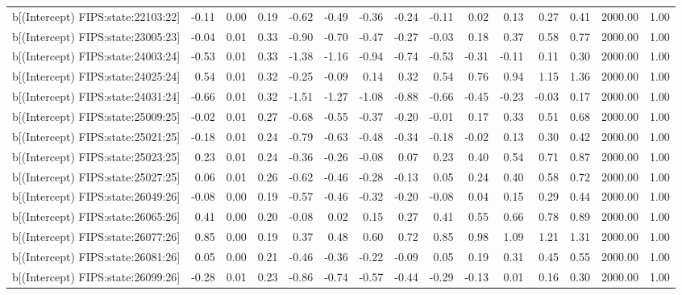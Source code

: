 \begin{table}[ht]
\begin{tabular}{rrrrrrrrrrrrrrr}
  b[(Intercept) FIPS:state:22103:22] & -0.11 & 0.00 & 0.19 & -0.62 & -0.49 & -0.36 & -0.24 & -0.11 & 0.02 & 0.13 & 0.27 & 0.41 & 2000.00 & 1.00 \\ 
  b[(Intercept) FIPS:state:23005:23] & -0.04 & 0.01 & 0.33 & -0.90 & -0.70 & -0.47 & -0.27 & -0.03 & 0.18 & 0.37 & 0.58 & 0.77 & 2000.00 & 1.00 \\ 
  b[(Intercept) FIPS:state:24003:24] & -0.53 & 0.01 & 0.33 & -1.38 & -1.16 & -0.94 & -0.74 & -0.53 & -0.31 & -0.11 & 0.11 & 0.30 & 2000.00 & 1.00 \\ 
  b[(Intercept) FIPS:state:24025:24] & 0.54 & 0.01 & 0.32 & -0.25 & -0.09 & 0.14 & 0.32 & 0.54 & 0.76 & 0.94 & 1.15 & 1.36 & 2000.00 & 1.00 \\ 
  b[(Intercept) FIPS:state:24031:24] & -0.66 & 0.01 & 0.32 & -1.51 & -1.27 & -1.08 & -0.88 & -0.66 & -0.45 & -0.23 & -0.03 & 0.17 & 2000.00 & 1.00 \\ 
  b[(Intercept) FIPS:state:25009:25] & -0.02 & 0.01 & 0.27 & -0.68 & -0.55 & -0.37 & -0.20 & -0.01 & 0.17 & 0.33 & 0.51 & 0.68 & 2000.00 & 1.00 \\ 
  b[(Intercept) FIPS:state:25021:25] & -0.18 & 0.01 & 0.24 & -0.79 & -0.63 & -0.48 & -0.34 & -0.18 & -0.02 & 0.13 & 0.30 & 0.42 & 2000.00 & 1.00 \\ 
  b[(Intercept) FIPS:state:25023:25] & 0.23 & 0.01 & 0.24 & -0.36 & -0.26 & -0.08 & 0.07 & 0.23 & 0.40 & 0.54 & 0.71 & 0.87 & 2000.00 & 1.00 \\ 
  b[(Intercept) FIPS:state:25027:25] & 0.06 & 0.01 & 0.26 & -0.62 & -0.46 & -0.28 & -0.13 & 0.05 & 0.24 & 0.40 & 0.58 & 0.72 & 2000.00 & 1.00 \\ 
  b[(Intercept) FIPS:state:26049:26] & -0.08 & 0.00 & 0.19 & -0.57 & -0.46 & -0.32 & -0.20 & -0.08 & 0.04 & 0.15 & 0.29 & 0.44 & 2000.00 & 1.00 \\ 
  b[(Intercept) FIPS:state:26065:26] & 0.41 & 0.00 & 0.20 & -0.08 & 0.02 & 0.15 & 0.27 & 0.41 & 0.55 & 0.66 & 0.78 & 0.89 & 2000.00 & 1.00 \\ 
  b[(Intercept) FIPS:state:26077:26] & 0.85 & 0.00 & 0.19 & 0.37 & 0.48 & 0.60 & 0.72 & 0.85 & 0.98 & 1.09 & 1.21 & 1.31 & 2000.00 & 1.00 \\ 
  b[(Intercept) FIPS:state:26081:26] & 0.05 & 0.00 & 0.21 & -0.46 & -0.36 & -0.22 & -0.09 & 0.05 & 0.19 & 0.31 & 0.45 & 0.55 & 2000.00 & 1.00 \\ 
  b[(Intercept) FIPS:state:26099:26] & -0.28 & 0.01 & 0.23 & -0.86 & -0.74 & -0.57 & -0.44 & -0.29 & -0.13 & 0.01 & 0.16 & 0.30 & 2000.00 & 1.00 \\ 

\end{tabular}
\end{table}
